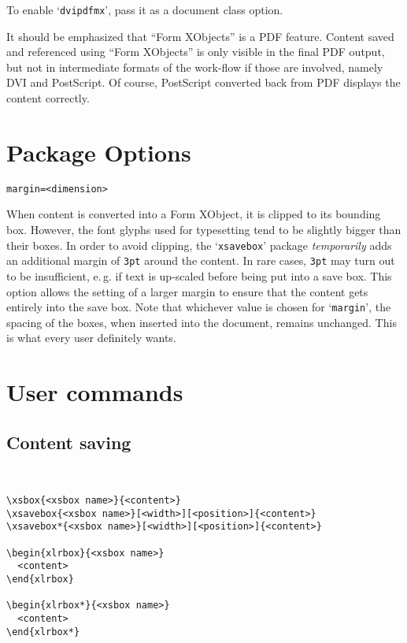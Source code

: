 \documentclass[a4paper]{article}
\begin{document}
To enable `\verb+dvipdfmx+', pass it as a document class option.

It should be emphasized that \enquote{Form XObjects} is a PDF feature. Content saved and referenced using \enquote{Form XObjects} is only visible in the final PDF output, but not in intermediate formats of the work-flow if those are involved, namely DVI and PostScript. Of course, PostScript converted back from PDF displays the content correctly.

\section{Package Options}
\begin{Verbatim}
margin=<dimension>  
\end{Verbatim}
When content is converted into a Form XObject, it is clipped to its bounding box. However, the font glyphs used for typesetting tend to be slightly bigger than their boxes. In order to avoid clipping, the `\verb+xsavebox+' package \emph{temporarily} adds an additional margin of \verb+3pt+ around the content. In rare cases, \verb+3pt+ may turn out to be insufficient, e.\,g. if text is up-scaled before being put into a save box. This option allows the setting of a larger margin to ensure that the content gets entirely into the save box. Note that whichever value is chosen for `\verb+margin+', the spacing of the boxes, when inserted into the document, remains unchanged. This is what every user definitely wants.

\section{User commands}
\subsection*{Content saving}
\vspace{-1\baselineskip}
\hrulefill\\[-1.6\baselineskip]
\begin{Verbatim}
\xsbox{<xsbox name>}{<content>}
\xsavebox{<xsbox name>}[<width>][<position>]{<content>}
\xsavebox*{<xsbox name>}[<width>][<position>]{<content>}

\begin{xlrbox}{<xsbox name>}
  <content>
\end{xlrbox}

\begin{xlrbox*}{<xsbox name>}
  <content>
\end{xlrbox*}
\end{Verbatim}
\vspace{-1\baselineskip}
\hrulefill\\[-1\baselineskip]
\end{document}
